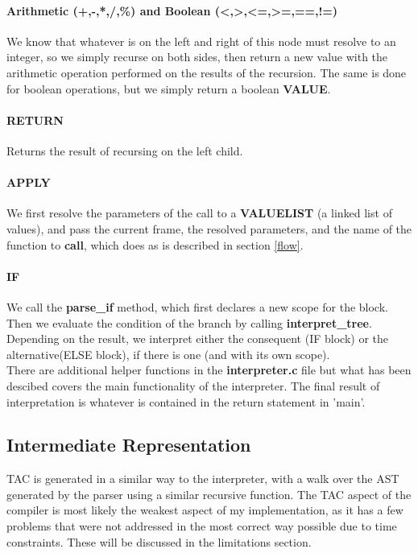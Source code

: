 \documentclass[12pt]{article}
\begin{document}
\paragraph{Arithmetic (+,-,*,/,\%) and Boolean (<,>,<=,>=,==,!=)} We know that whatever is on the left and right of this node must resolve to an integer, so we simply recurse on both sides, then return a new value with the arithmetic operation performed on the results of the recursion. The same is done for boolean operations, but we simply return a boolean \textbf{VALUE}.
\paragraph{RETURN} Returns the result of recursing on the left child.
\paragraph{APPLY} We first resolve the parameters of the call to a \textbf{VALUELIST} (a linked list of values), and pass the current frame, the resolved parameters, and the name of the function to \textbf{call}, which does as is described in section \ref{flow}.
\paragraph{IF} We call the \textbf{parse\_if} method, which first declares a new scope for the block. Then we evaluate the condition of the branch by calling \textbf{interpret\_tree}. Depending on the result, we interpret either the consequent (IF block) or the alternative(ELSE block), if there is one (and with its own scope).
\\\newline There are additional helper functions in the \textbf{interpreter.c} file but what has been descibed covers the main functionality of the interpreter. The final result of interpretation is whatever is contained in the return statement in 'main'.
\subsection{Intermediate Representation}\label{inmed}
TAC is generated in a similar way to the interpreter, with a walk over the AST generated by the parser using a similar recursive function. The TAC aspect of the compiler is most likely the weakest aspect of my implementation, as it has a few problems that were not addressed in the most correct way possible due to time constraints. These will be discussed in the limitations section.
\end{document}
